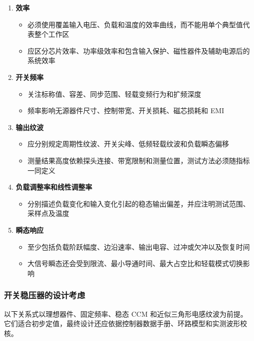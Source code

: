 \begin{enumerate}
  \item \textbf{效率}
    \begin{itemize}
      \item 必须使用覆盖输入电压、负载和温度的效率曲线，而不能用单个典型值代表整个工作区
      \item 应区分芯片效率、功率级效率和包含输入保护、磁性器件及辅助电源后的系统效率
    \end{itemize}

  \item \textbf{开关频率}
    \begin{itemize}
      \item 关注标称值、容差、同步范围、轻载变频行为和扩频深度
      \item 频率影响无源器件尺寸、控制带宽、开关损耗、磁芯损耗和 EMI
    \end{itemize}

  \item \textbf{输出纹波}
    \begin{itemize}
      \item 应分别规定周期性纹波、开关尖峰、低频轻载纹波和负载瞬态偏移
      \item 测量结果高度依赖探头连接、带宽限制和测量位置，测试方法必须随指标一同定义
    \end{itemize}

  \item \textbf{负载调整率和线性调整率}
    \begin{itemize}
      \item 分别描述负载变化和输入变化引起的稳态输出偏差，并应注明测试范围、采样点及温度
    \end{itemize}

  \item \textbf{瞬态响应}
    \begin{itemize}
      \item 至少包括负载阶跃幅度、边沿速率、输出电容、过冲或欠冲以及恢复时间
      \item 大信号瞬态还会受到限流、最小导通时间、最大占空比和轻载模式切换影响
    \end{itemize}
\end{enumerate}

\subsubsection{开关稳压器的设计考虑}

以下关系式以理想器件、固定频率、稳态 CCM 和近似三角形电感纹波为前提。它们适合初步定值，最终设计还应依据控制器数据手册、环路模型和实测波形校核。

